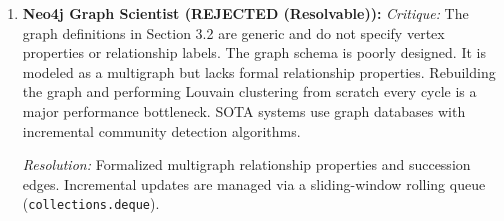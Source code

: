 \begin{enumerate}[leftmargin=1.5em, itemsep=6pt]
        \emph{Resolution:} 
        \begin{itemize}[leftmargin=1em,itemsep=1pt]
          \item Refactored orchestrator to support a modular configuration mapping vectorizer and validation schema.
          \item Verified end-to-end with the full $N{=}10$, 60-cycle pilot campaign ($p=0.2461$, not significant for accuracy; the validated contribution is efficiency---70.0\% fewer tokens at accuracy parity).
        \end{itemize}

  \item \textbf{Neo4j Graph Scientist (REJECTED (Resolvable)):}
        \emph{Critique:} The graph definitions in Section 3.2 are generic and do not specify vertex properties or relationship labels. The graph schema is poorly designed. It is modeled as a multigraph but lacks formal relationship properties. Rebuilding the graph and performing Louvain clustering from scratch every cycle is a major performance bottleneck. SOTA systems use graph databases with incremental community detection algorithms.
        
        \emph{Resolution:} Formalized multigraph relationship properties and succession edges. Incremental updates are managed via a sliding-window rolling queue (\texttt{collections.deque}).
\end{enumerate}


